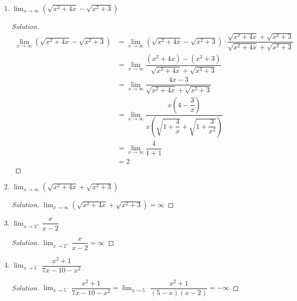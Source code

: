 \documentclass[12pt]{article}
\newenvironment{solution}{\begin{proof}[Solution]}{\end{proof}}
\begin{document}
\begin{enumerate}
\begin{enumerate}
\begin{solution}
				\begin{align*}
					\displaystyle{\lim_{x\to\infty} (x-\sqrt{x^2+2x})}&=\displaystyle{\lim_{x\to\infty} (x-\sqrt{x^2+2x})\cdot \dfrac{x+\sqrt{x^2+2x}}{x+\sqrt{x^2+2x}}}\\
					&=\displaystyle{\lim_{x\to\infty}\dfrac{x^2-(x^2+2x)}{x+\sqrt{x^2+2x}}}\\
					&= \displaystyle{\lim_{x\to\infty}\dfrac{-2x}{x(1+\sqrt{1+\dfrac{2}{x}})}}\\
					&=-2
				\end{align*}
			\end{solution}
			\item $\displaystyle{\lim_{x\to \infty}(\sqrt{x^2+4x}-\sqrt{x^2+3})}$
			\begin{solution}
				\begin{align*}
					\displaystyle{\lim_{x\to \infty}(\sqrt{x^2+4x}-\sqrt{x^2+3})}&=\displaystyle{\lim_{x\to \infty}(\sqrt{x^2+4x}-\sqrt{x^2+3})\cdot\dfrac{\sqrt{x^2+4x}+\sqrt{x^2+3}}{\sqrt{x^2+4x}+\sqrt{x^2+3}}}\\
					&=\displaystyle{\lim_{x\to\infty} \dfrac{(x^2+4x)-(x^2+3)}{\sqrt{x^2+4x}+\sqrt{x^2+3}}}\\
					&=\displaystyle{\lim_{x\to\infty} \dfrac{4x-3}{\sqrt{x^2+4x}+\sqrt{x^2+3}}}\\
					&=\displaystyle{\lim_{x\to\infty} \dfrac{x(4-\dfrac{3}{x})}{x(\sqrt{1+\dfrac{4}{x}}+\sqrt{1+\dfrac{3}{x^2}})}}\\
					&=\displaystyle{\lim_{x\to\infty} \dfrac{4}{1+1}}\\
					&=2
				\end{align*}
			\end{solution}
			\item $\displaystyle{\lim_{x\to \infty}(\sqrt{x^2+4x}+\sqrt{x^2+3})}$
			\begin{solution}
				$\displaystyle{\lim_{x\to \infty}(\sqrt{x^2+4x}+\sqrt{x^2+3})}=\infty$
			\end{solution}
			\item $\displaystyle{\lim_{x\to2^+}\dfrac{x}{x-2}}$
			\begin{solution}
				$\displaystyle{\lim_{x\to2^+}\dfrac{x}{x-2}}=\infty$
			\end{solution}
		
			\item $\displaystyle{\lim_{x\to 5^-} \dfrac{x^2+1}{7x-10-x^2}}$
			\begin{solution}
				$\displaystyle{\lim_{x\to 5^-} \dfrac{x^2+1}{7x-10-x^2}}=\displaystyle{\lim_{x\to 5^-} \dfrac{x^2+1}{(5-x)(x-2)}}=-\infty$
			\end{solution}
			

\end{enumerate}
\end{enumerate}
\end{document}
